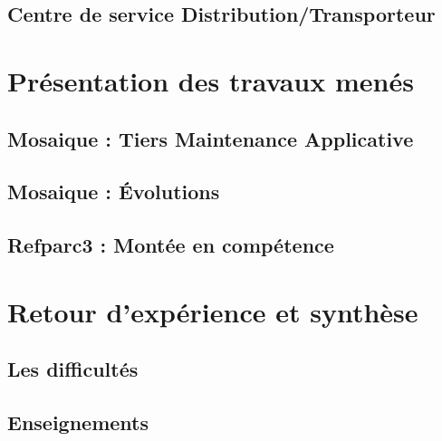 \documentclass[twoside, 12pt]{report}
\begin{document}
    \section{Centre de service Distribution/Transporteur}
    
        
        
\chapter{Présentation des travaux menés}
    
    

    \section{Mosaique : Tiers Maintenance Applicative}
    
        
    
    \section{Mosaique : Évolutions}
    
        
    
    \section{Refparc3 : Montée en compétence}
    
        

\chapter{Retour d'expérience et synthèse}

    

    \section{Les difficultés}

        
    
    \section{Enseignements}

        
    
\end{document}
